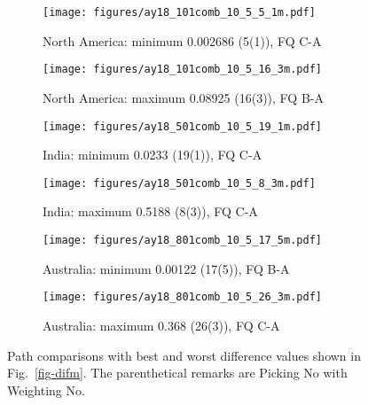 \begin{figure*}
	\centering
	\begin{subfigure}{.42\textwidth}
		\texttt{[image: figures/ay18\_101comb\_10\_5\_5\_1m.pdf]}
		\caption{North America: minimum 0.002686 (5(1)), FQ C-A}
	\end{subfigure}
	\begin{subfigure}{.42\textwidth}
		\texttt{[image: figures/ay18\_101comb\_10\_5\_16\_3m.pdf]}
		\caption{North America: maximum 0.08925 (16(3)), FQ B-A}
	\end{subfigure}
	\vspace{.1em}
	\begin{subfigure}{.42\textwidth}
		\texttt{[image: figures/ay18\_501comb\_10\_5\_19\_1m.pdf]}
		\caption{India: minimum 0.0233 (19(1)), FQ C-A}
	\end{subfigure}
	\begin{subfigure}{.42\textwidth}
		\texttt{[image: figures/ay18\_501comb\_10\_5\_8\_3m.pdf]}
		\caption{India: maximum 0.5188 (8(3)), FQ C-A}
	\end{subfigure}
	\vspace{.1em}
	\begin{subfigure}{.42\textwidth}
		\texttt{[image: figures/ay18\_801comb\_10\_5\_17\_5m.pdf]}
		\caption{Australia: minimum 0.00122 (17(5)), FQ B-A}
	\end{subfigure}
	\begin{subfigure}{.42\textwidth}
		\texttt{[image: figures/ay18\_801comb\_10\_5\_26\_3m.pdf]}
		\caption{Australia: maximum 0.368 (26(3)), FQ C-A}
	\end{subfigure}
	\caption[Best and worst differences (10 Myr bin, 5 Myr
step)]{Path comparisons with best and worst difference values shown in
Fig.~\ref{fig-difm}. The parenthetical remarks are Picking No with Weighting
No.}\label{fig-difbwm}
\end{figure*}

